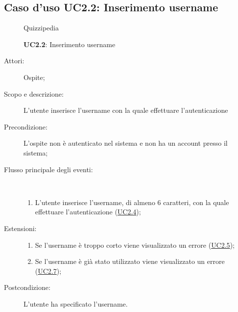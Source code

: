 \subsection{Caso d'uso UC2.2: Inserimento username}
	\begin{figure}[H]
		\centering
		\begin{resizedtikzpicture}{\textwidth}
		\begin{umlsystem}[x=0, fill=lightgray!20]{Quizzipedia}
		\end{umlsystem}
		\end{resizedtikzpicture}
		\caption{\textbf{UC2.2}: Inserimento username}
		\label{UC2.2}
	\end{figure}
\begin{description}
\item[Attori:] Ospite;
\item[Scopo e descrizione:] L'utente inserisce l'username con la quale effettuare l'autenticazione
      \item[Precondizione:] L'ospite non è autenticato nel sistema e non ha un account presso il sistema;

        \item[Flusso principale degli eventi:] \ 
 \begin{enumerate}
          \item L'utente inserisce l'username, di almeno 6 caratteri, con la quale effettuare l'autenticazione  (\hyperlink{UC2.4}{UC2.4});

      \end{enumerate}
    \item[Estensioni:]
      \begin{enumerate}
          \item Se l'username è troppo corto viene visualizzato un errore (\hyperlink{UC2.5}{UC2.5});
          \item Se l'username è già stato utilizzato viene visualizzato un errore (\hyperlink{UC2.7}{UC2.7});

      \end{enumerate}
    \item[Postcondizione:] L'utente ha specificato l'username.
  \end{description}
\hypertarget{UC2.3}{}
